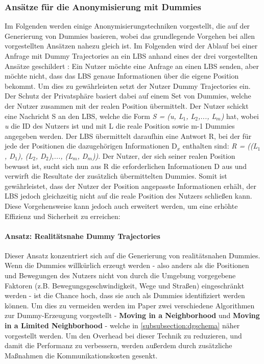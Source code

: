 \subsubsection{Ansätze für die Anonymisierung mit Dummies} \label{subsubsection:realdummy}
Im Folgenden werden einige Anonymisierungstechniken vorgestellt, die auf der Generierung von Dummies basieren, wobei das grundlegende Vorgehen bei allen vorgestellten Ansätzen nahezu gleich ist. Im Folgenden wird der Ablauf bei einer Anfrage mit Dummy Trajectories an ein LBS anhand eines der drei vorgestellten Ansätze geschildert \cite{Kido2005}: Ein Nutzer möchte eine Anfrage an einen LBS senden, aber möchte nicht, dass das LBS genaue Informationen über die eigene Position bekommt. Um dies zu gewährleisten setzt der Nutzer Dummy Trajectories ein. Der Schutz der Privatsphäre basiert dabei auf einem Set von Dummies, welche der Nutzer zusammen mit der realen Position übermittelt. Der Nutzer schickt eine Nachricht S an den LBS, welche die Form \textit{S = (u, L$_{1}$, L$_{2}$,..., L$_{m}$)} hat, wobei \textit{u} die ID des Nutzers ist und mit L die reale Position sowie m-1 Dummies angegeben werden. Der LBS übermittelt daraufhin eine Antwort R, bei der für jede der Positionen die dazugehörigen Informationen D$_{x}$ enthalten sind: \textit{R = ((L$_{1}$, D$_{1}$), (L$_{2}$, D$_{2}$),..., (L$_{m}$, D$_{m}$))}. Der Nutzer, der sich seiner realen Position bewusst ist, sucht sich nun aus R die erforderlichen Informationen D aus und verwirft die Resultate der zusätzlich übermittelten Dummies. Somit ist gewährleistet, dass der Nutzer der Position angepasste Informationen erhält, der LBS jedoch gleichzeitig nicht auf die reale Position des Nutzers schließen kann. Diese Vorgehensweise kann jedoch auch erweitert werden, um eine erhöhte Effizienz und Sicherheit zu erreichen:

\paragraph{Ansatz: Realitätsnahe Dummy Trajectories \cite{Kido2005}} \label{para:simple}
Dieser Ansatz konzentriert sich auf die Generierung von realitätsnahen Dummies. Wenn die Dummies willkürlich erzeugt werden - also anders als die Positionen und Bewegungen des Nutzers nicht von durch die Umgebung vorgegebene Faktoren (z.B. Bewegungsgeschwindigkeit, Wege und Straßen) eingeschränkt werden - ist die Chance hoch, dass sie auch als Dummies identifiziert werden können. Um dies zu vermeiden werden im Paper zwei verschiedene Algorithmen zur Dummy-Erzeugung vorgestellt - \textbf{Moving in a Neighborhood} und \textbf{Moving in a Limited Neighborhood} - welche in \ref{subsubsection:dgschema} näher vorgestellt werden. Um den Overhead bei dieser Technik zu reduzieren, und damit die Performanz zu verbessern, werden außerdem durch zusätzliche Maßnahmen die Kommunikationskosten gesenkt.

